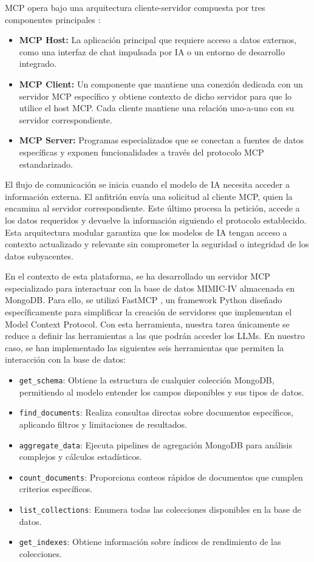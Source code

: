 MCP opera bajo una arquitectura cliente-servidor compuesta por tres componentes principales \cite{mcp_arch}:

\begin{itemize}
\item \textbf{MCP Host:} La aplicación principal que requiere acceso a datos externos, como una interfaz de chat impulsada por IA o un entorno de desarrollo integrado.
\item \textbf{MCP Client:} Un componente que mantiene una conexión dedicada con un servidor MCP específico y obtiene contexto de dicho servidor para que lo utilice el host MCP. Cada cliente mantiene una relación uno-a-uno con su servidor correspondiente.
\item \textbf{MCP Server:} Programas especializados que se conectan a fuentes de datos específicas y exponen funcionalidades a través del protocolo MCP estandarizado.
\end{itemize}

El flujo de comunicación se inicia cuando el modelo de IA necesita acceder a información externa. El anfitrión envía una solicitud al cliente MCP, quien la encamina al servidor correspondiente. Este último procesa la petición, accede a los datos requeridos y devuelve la información siguiendo el protocolo establecido. Esta arquitectura modular garantiza que los modelos de IA tengan acceso a contexto actualizado y relevante sin comprometer la seguridad o integridad de los datos subyacentes.

En el contexto de esta plataforma, se ha desarrollado un servidor MCP especializado para interactuar con la base de datos MIMIC-IV almacenada en MongoDB. Para ello, se utilizó FastMCP \cite{fastmcp}, un framework Python diseñado específicamente para simplificar la creación de servidores que implementan el Model Context Protocol. Con esta herramienta, nuestra tarea únicamente se reduce a definir las herramientas a las que podrán acceder los LLMs. En nuestro caso, se han implementado las siguientes seis herramientas que permiten la interacción con la base de datos:

\begin{itemize}
\item \texttt{get\_schema}: Obtiene la estructura de cualquier colección MongoDB, permitiendo al modelo entender los campos disponibles y sus tipos de datos.
\item \texttt{find\_documents}: Realiza consultas directas sobre documentos específicos, aplicando filtros y limitaciones de resultados.
\item \texttt{aggregate\_data}: Ejecuta pipelines de agregación MongoDB para análisis complejos y cálculos estadísticos.
\item \texttt{count\_documents}: Proporciona conteos rápidos de documentos que cumplen criterios específicos.
\item \texttt{list\_collections}: Enumera todas las colecciones disponibles en la base de datos.
\item \texttt{get\_indexes}: Obtiene información sobre índices de rendimiento de las colecciones.
\end{itemize}


